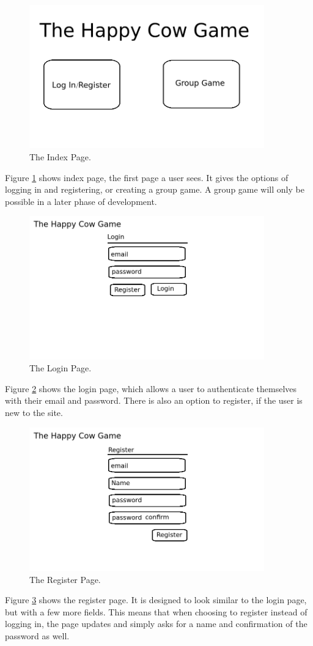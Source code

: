 \begin{figure}[ht]
\centering
\includegraphics[width=4in]{Images/2/pages-1-welcome}
\caption{The Index Page.}
\label{2_page_index}
\end{figure}
Figure \ref{2_page_index} shows index page, the first page a user sees. It gives the options of logging in and registering, 
or creating a group game. A group game will only be possible in a later phase of development. 

\begin{figure}[ht]
\centering
\includegraphics[width=4in]{Images/2/pages-2-login}
\caption{The Login Page.}
\label{2_page_login}
\end{figure}
Figure \ref{2_page_login} shows the login page, which allows a user to authenticate themselves with their email and password. There is also an option to register, if the user is new to the site.

\begin{figure}[ht]
\centering
\includegraphics[width=4in]{Images/2/pages-3-register}
\caption{The Register Page.}
\label{2_page_register}
\end{figure}
Figure \ref{2_page_register} shows the register page. It is designed to look similar to the login page, but with a few more fields. This means that when choosing to register instead of logging in, the page updates and simply asks for a name and confirmation of the password as well. 

